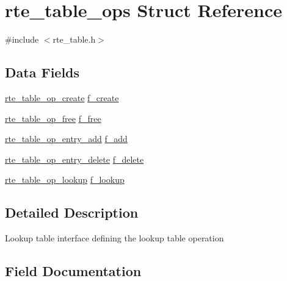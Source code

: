 \hypertarget{structrte__table__ops}{}\section{rte\+\_\+table\+\_\+ops Struct Reference}
\label{structrte__table__ops}


{\ttfamily \#include $<$rte\+\_\+table.\+h$>$}

\subsection*{Data Fields}
\begin{DoxyCompactItemize}
\item 
\hyperlink{rte__table_8h_a4e1615bdd61e29e63f8ecbf7110813b0}{rte\+\_\+table\+\_\+op\+\_\+create} \hyperlink{structrte__table__ops_a582953d3e215188ebc56a5d8e31b8979}{f\+\_\+create}
\item 
\hyperlink{rte__table_8h_a65b68c2ba76ffda7825de88ff1627d2b}{rte\+\_\+table\+\_\+op\+\_\+free} \hyperlink{structrte__table__ops_a19eeac6f1dcc70175d34134a189b1ff6}{f\+\_\+free}
\item 
\hyperlink{rte__table_8h_aaab350845daf6098fe049d1868d078ea}{rte\+\_\+table\+\_\+op\+\_\+entry\+\_\+add} \hyperlink{structrte__table__ops_a6bc8d96534542847a93a467448278380}{f\+\_\+add}
\item 
\hyperlink{rte__table_8h_a70a2ede171286c456a1e8a7fce90a62b}{rte\+\_\+table\+\_\+op\+\_\+entry\+\_\+delete} \hyperlink{structrte__table__ops_a3409b4198a8d76aaa2c839855e39ea71}{f\+\_\+delete}
\item 
\hyperlink{rte__table_8h_a9e058e310bef6b604ef665e070c88b41}{rte\+\_\+table\+\_\+op\+\_\+lookup} \hyperlink{structrte__table__ops_a36c72b180da058faec39cd6dc89dd7e9}{f\+\_\+lookup}
\end{DoxyCompactItemize}


\subsection{Detailed Description}
Lookup table interface defining the lookup table operation 

\subsection{Field Documentation}
\hypertarget{structrte__table__ops_a6bc8d96534542847a93a467448278380}{}
